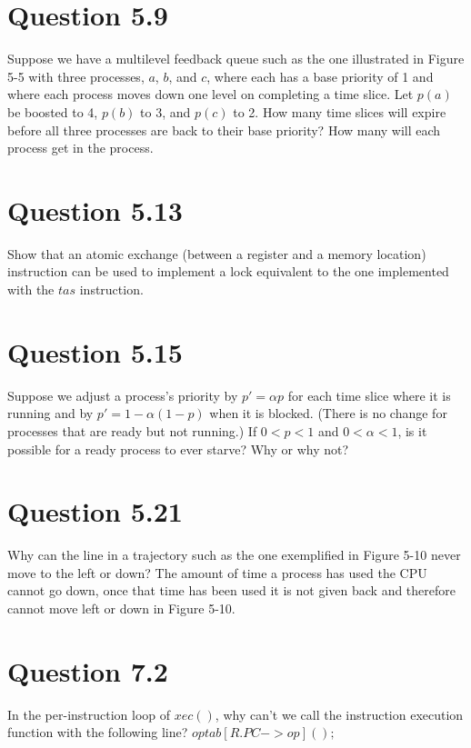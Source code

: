 \documentclass{article}
\begin{document}
\section*{Question 5.9}
Suppose we have a multilevel feedback queue such as the one illustrated in Figure 5-5 with three processes, $a$, $b$, and $c$, where each has a base priority of 1 and where each process moves down one level on completing a time slice.
Let $p(a)$ be boosted to 4, $p(b)$ to 3, and $p(c)$ to 2.
How many time slices will expire before all three processes are back to their base priority?
How many will each process get in the process.
\newline

\section*{Question 5.13}
Show that an atomic exchange (between a register and a memory location) instruction can be used to implement a lock equivalent to the one implemented with the $tas$ instruction.
\newline


\section*{Question 5.15}
Suppose we adjust a process's priority by $p' = \alpha p$ for each time slice where it is running and by $p' = 1 - \alpha (1-p)$ when it is blocked.
(There is no change for processes that are ready but not running.)
If $0<p<1$ and $0<\alpha<1$, is it possible for a ready process to ever starve? Why or why not?
\newline


\section*{Question 5.21}
Why can the line in a trajectory such as the one exemplified in Figure 5-10 never move to the left or down?
\newline
The amount of time a process has used the CPU cannot go down, once that time has been used it is not given back and therefore cannot move left or down in Figure 5-10.

\section*{Question 7.2}
In the per-instruction loop of $xec()$, why can't we call the instruction execution function with the following line? $optab[R.PC->op]();$
\end{document}
